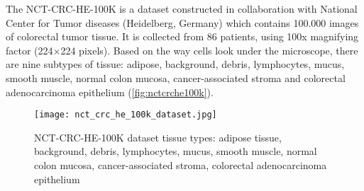 The NCT-CRC-HE-100K \cite{kather_jakob_nikolas_2018_1214456} is a dataset constructed in collaboration with National Center for Tumor diseases (Heidelberg, Germany) which contains 100.000 images of colorectal tumor tissue. It is collected from 86 patients, using 100x magnifying factor (224$\times$224 pixels). Based on the way cells look under the microscope, there are nine subtypes of tissue: adipose, background, debris, lymphocytes, mucus, smooth muscle, normal colon mucosa, cancer-associated stroma and colorectal adenocarcinoma epithelium (\textcolor{red}{\autoref{fig:nctcrche100k}}).

\begin{figure}[h]
	\centering
	\texttt{[image: nct\_crc\_he\_100k\_dataset.jpg]}
	\caption{NCT-CRC-HE-100K dataset tissue types: adipose tissue, background, debris, lymphocytes, mucus, smooth muscle, normal colon mucosa, cancer-associated stroma, colorectal adenocarcinoma epithelium}
	\label{fig:nctcrche100k}
\end{figure}
